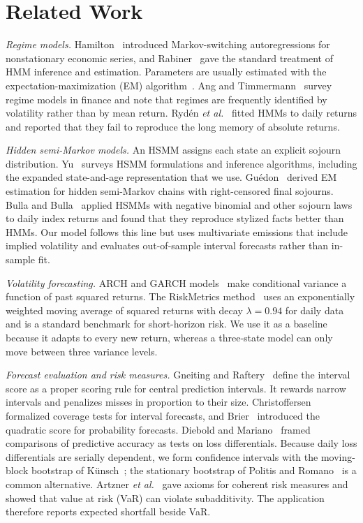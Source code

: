 \documentclass[conference]{IEEEtran}
\begin{document}
\section{Related Work}
\textit{Regime models.} Hamilton~\cite{hamilton1989} introduced Markov-switching autoregressions for nonstationary economic series, and Rabiner~\cite{rabiner1989} gave the standard treatment of HMM inference and estimation. Parameters are usually estimated with the expectation-maximization (EM) algorithm~\cite{dempster1977}. Ang and Timmermann~\cite{ang2012} survey regime models in finance and note that regimes are frequently identified by volatility rather than by mean return. Ryd\'en \emph{et al.}~\cite{ryden1998} fitted HMMs to daily returns and reported that they fail to reproduce the long memory of absolute returns.

\textit{Hidden semi-Markov models.} An HSMM assigns each state an explicit sojourn distribution. Yu~\cite{yu2010} surveys HSMM formulations and inference algorithms, including the expanded state-and-age representation that we use. Gu\'edon~\cite{guedon2003} derived EM estimation for hidden semi-Markov chains with right-censored final sojourns. Bulla and Bulla~\cite{bulla2006} applied HSMMs with negative binomial and other sojourn laws to daily index returns and found that they reproduce stylized facts better than HMMs. Our model follows this line but uses multivariate emissions that include implied volatility and evaluates out-of-sample interval forecasts rather than in-sample fit.

\textit{Volatility forecasting.} ARCH and GARCH models~\cite{engle1982,bollerslev1986} make conditional variance a function of past squared returns. The RiskMetrics method~\cite{riskmetrics1996} uses an exponentially weighted moving average of squared returns with decay $\lambda=0.94$ for daily data and is a standard benchmark for short-horizon risk. We use it as a baseline because it adapts to every new return, whereas a three-state model can only move between three variance levels.

\textit{Forecast evaluation and risk measures.} Gneiting and Raftery~\cite{gneiting2007} define the interval score as a proper scoring rule for central prediction intervals. It rewards narrow intervals and penalizes misses in proportion to their size. Christoffersen~\cite{christoffersen1998} formalized coverage tests for interval forecasts, and Brier~\cite{brier1950} introduced the quadratic score for probability forecasts. Diebold and Mariano~\cite{diebold1995} framed comparisons of predictive accuracy as tests on loss differentials. Because daily loss differentials are serially dependent, we form confidence intervals with the moving-block bootstrap of K\"unsch~\cite{kunsch1989}; the stationary bootstrap of Politis and Romano~\cite{politis1994} is a common alternative. Artzner \emph{et al.}~\cite{artzner1999} gave axioms for coherent risk measures and showed that value at risk (VaR) can violate subadditivity. The application therefore reports expected shortfall beside VaR.
\end{document}
